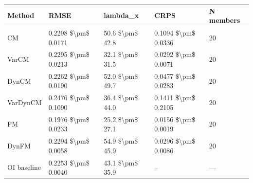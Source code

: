 \begin{tabular}{lllll}
\toprule
 Method      & RMSE                & lambda\_x        & CRPS                & N members   \\
\midrule
 CM          & 0.2298 \$\textbackslash{}pm\$ 0.0171 & 50.6 \$\textbackslash{}pm\$ 42.8 & 0.1094 \$\textbackslash{}pm\$ 0.0336 & 20          \\
 VarCM       & 0.2295 \$\textbackslash{}pm\$ 0.0213 & 32.1 \$\textbackslash{}pm\$ 31.5 & 0.0292 \$\textbackslash{}pm\$ 0.0071 & 20          \\
 DynCM       & 0.2262 \$\textbackslash{}pm\$ 0.0190 & 52.0 \$\textbackslash{}pm\$ 49.7 & 0.0477 \$\textbackslash{}pm\$ 0.0283 & 20          \\
 VarDynCM    & 0.2476 \$\textbackslash{}pm\$ 0.1090 & 36.4 \$\textbackslash{}pm\$ 44.0 & 0.1411 \$\textbackslash{}pm\$ 0.2105 & 20          \\
 FM          & 0.1976 \$\textbackslash{}pm\$ 0.0233 & 25.2 \$\textbackslash{}pm\$ 27.1 & 0.0156 \$\textbackslash{}pm\$ 0.0019 & 20          \\
 DynFM       & 0.2294 \$\textbackslash{}pm\$ 0.0058 & 54.9 \$\textbackslash{}pm\$ 45.9 & 0.0296 \$\textbackslash{}pm\$ 0.0086 & 20          \\
 OI baseline & 0.2253 \$\textbackslash{}pm\$ 0.0040 & 43.1 \$\textbackslash{}pm\$ 35.9 & --                  & —           \\
\bottomrule
\end{tabular}
